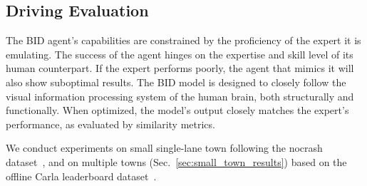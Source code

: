 

\subsection{Driving Evaluation}
\label{sec:Metrics}
\hspace{1pc}The BID agent's capabilities are constrained by the proficiency of the expert it is emulating. 
The success of the agent hinges on the expertise and skill level of its human counterpart.
If the expert performs poorly, the agent that mimics it will also show suboptimal results. 
The BID model is designed to closely follow the visual information processing system of the human brain, both structurally and functionally. 
When optimized, the model's output closely matches the expert's performance, as evaluated by similarity metrics.


We conduct experiments on small single-lane town following the nocrash dataset~\cite{Zhang:2021,Hu:2022}, and on multiple towns (Sec.~\ref{sec:small_town_results}) based on the offline Carla leaderboard dataset~\cite{Zhang:2021,Hu:2022}. 


